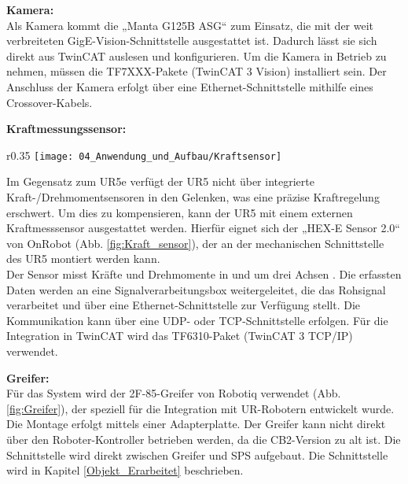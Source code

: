 	\textbf{Kamera:}
	\vspace{2mm} 
	\\
	Als Kamera kommt die „Manta G125B ASG“ zum Einsatz, die mit der weit verbreiteten GigE-Vision-Schnittstelle ausgestattet ist. Dadurch lässt sie sich direkt aus TwinCAT auslesen und konfigurieren. Um die Kamera in Betrieb zu nehmen, müssen die TF7XXX-Pakete (TwinCAT 3 Vision) installiert sein. Der Anschluss der Kamera erfolgt über eine Ethernet-Schnittstelle mithilfe eines Crossover-Kabels.
	
	\newpage
	
	\textbf{Kraftmessungssensor:}
	\vspace{2mm} 
	\vspace{-3mm} 
	\vspace{-\baselineskip}
	\vspace{-\baselineskip}
	\\
	\begin{wrapfigure}{r}{0.35\textwidth}
		\centering
		\texttt{[image: 04\_Anwendung\_und\_Aufbau/Kraftsensor]}
		\captionsetup{justification=centering}
		\caption{Kraftsensor}
		\label{fig:Kraft_sensor}
	\end{wrapfigure} \par
	Im Gegensatz zum UR5e verfügt der UR5 nicht über integrierte Kraft-/Drehmomentsensoren in den Gelenken, was eine präzise Kraftregelung erschwert. Um dies zu kompensieren, kann der UR5 mit einem externen Kraftmesssensor ausgestattet werden. Hierfür eignet sich der „HEX-E Sensor 2.0“ von OnRobot (Abb. \ref{fig:Kraft_sensor}), der an der mechanischen Schnittstelle des UR5 montiert werden kann. 
	\\
	Der Sensor misst Kräfte und Drehmomente in und um drei Achsen \cite{HexE}. Die erfassten Daten werden an eine Signalverarbeitungsbox weitergeleitet, die das Rohsignal verarbeitet und über eine Ethernet-Schnittstelle zur Verfügung stellt. Die Kommunikation kann über eine UDP- oder TCP-Schnittstelle erfolgen. Für die Integration in TwinCAT wird das TF6310-Paket (TwinCAT 3 TCP/IP) verwendet.
	
	\textbf{Greifer:}
	\vspace{2mm} 
	\\
	Für das System wird der 2F-85-Greifer von Robotiq verwendet (Abb. \ref{fig:Greifer}), der speziell für die Integration mit UR-Robotern entwickelt wurde. Die Montage erfolgt mittels einer Adapterplatte. Der Greifer kann nicht direkt über den Roboter-Kontroller betrieben werden, da die CB2-Version zu alt ist. Die Schnittstelle wird direkt zwischen Greifer und \Gls{SPS} aufgebaut. Die Schnittstelle wird in Kapitel \ref{Objekt_Erarbeitet} beschrieben.
	
